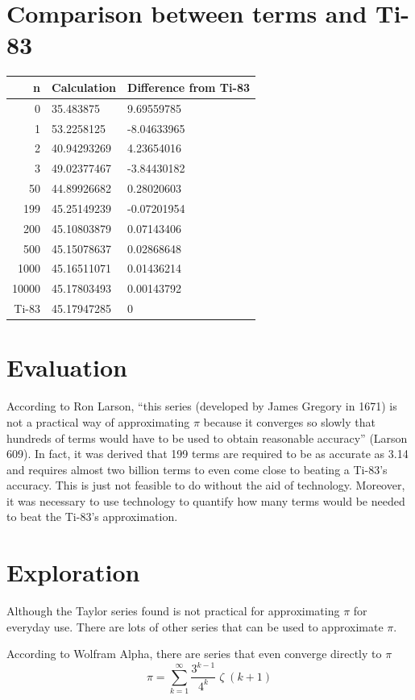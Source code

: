 \documentclass[12pt, titlepage]{article}
\begin{document}
\section{Comparison between terms and Ti-83}
\begin{center}
  \begin{tabular}{rll}
  n & Calculation & Difference from Ti-83\\
  \hline
    0 & 35.483875 & 9.69559785\\
  1 & 53.2258125 & -8.04633965\\
  2 & 40.94293269 & 4.23654016\\
  3 & 49.02377467 & -3.84430182\\
  50 & 44.89926682& 0.28020603\\
  199 & 45.25149239 &-0.07201954 \\
  200 &  45.10803879& 0.07143406\\
  500 & 45.15078637 & 0.02868648\\
  1000 & 45.16511071 & 0.01436214\\
  10000 & 45.17803493 & 0.00143792\\
  \hline
  Ti-83 & 45.17947285  & 0\\
  \end{tabular}
\end{center}

\section{Evaluation}
According to Ron Larson, “this series (developed by James Gregory in 1671) is not a practical way of approximating \(\pi\) because it converges so slowly that hundreds of terms would have to be used to obtain reasonable accuracy” (Larson 609). In fact, it was derived that 199 terms are required to be as accurate as 3.14 and requires almost two billion terms to even come close to beating a Ti-83’s accuracy. This is just not feasible to do without the aid of technology. Moreover, it was necessary to use technology to quantify how many terms would be needed to beat the Ti-83’s approximation.
\section{Exploration}
Although the Taylor series found is not practical for approximating \(\pi\) for everyday use. There are lots of other series that can be used to approximate \(\pi\). 

According to Wolfram Alpha, there are series that even converge directly to \(\pi\)
\begin{equation}
    \pi = \sum_{k=1}^{\infty} \frac{3^{k-1}}{4^{k}} \; \zeta \;(k+1)
\end{equation}
\end{document}
